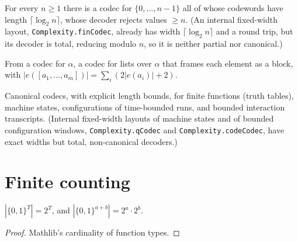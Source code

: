 \begin{lemma}
  \label{lem:encodings-fin-codec}
  \notready
  For every $n \ge 1$ there is a codec for $\{0, \dots, n-1\}$ all of whose
  codewords have length $\lceil \log_2 n \rceil$, whose decoder rejects values
  $\ge n$. (An internal fixed-width layout, \texttt{Complexity.finCodec},
  already has width $\lceil \log_2 n \rceil$ and a round trip, but its decoder
  is total, reducing modulo $n$, so it is neither partial nor canonical.)
\end{lemma}

\begin{definition}
  \label{def:encodings-list-codec}
  \notready
  From a codec for $\alpha$, a codec for lists over $\alpha$ that frames each
  element as a block, with
  $|e([a_1, \dots, a_m])| = \sum_i (2|e(a_i)| + 2)$.
\end{definition}

\begin{definition}
  \label{def:encodings-machine-codes}
  \notready
  Canonical codecs, with explicit length bounds, for finite functions (truth
  tables), machine states, configurations of time-bounded runs, and bounded
  interaction transcripts. (Internal fixed-width layouts of machine states and
  of bounded configuration windows, \texttt{Complexity.qCodec} and
  \texttt{Complexity.codeCodec}, have exact widths but total, non-canonical
  decoders.)
\end{definition}

\section{Finite counting}

\begin{lemma}
  \label{lem:encodings-card}
  \leanok
  $|\{0,1\}^T| = 2^T$, and $|\{0,1\}^{a+b}| = 2^a \cdot 2^b$.
\end{lemma}
\begin{proof}
  \leanok
  Mathlib's cardinality of function types.
\end{proof}

